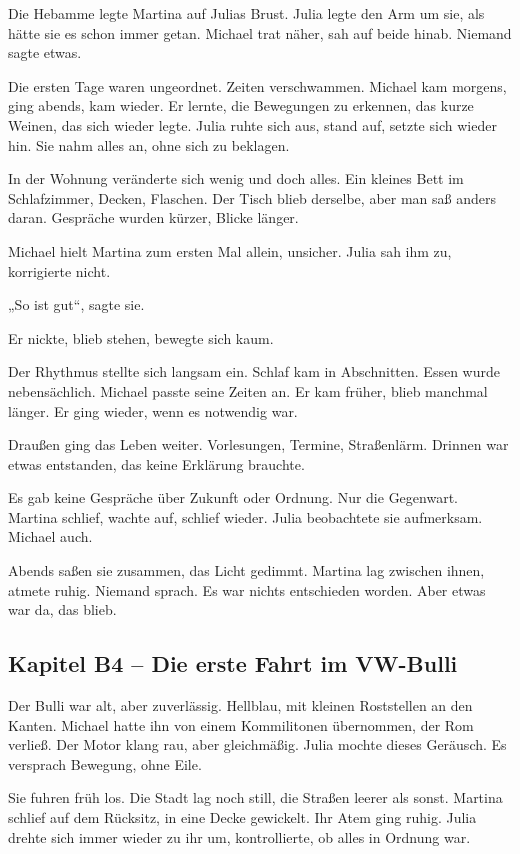 \documentclass[
]{article}
\begin{document}
Die Hebamme legte Martina auf Julias Brust. Julia legte den Arm um sie, als hätte sie es schon immer getan. Michael trat näher, sah auf beide hinab. Niemand sagte etwas.

Die ersten Tage waren ungeordnet. Zeiten verschwammen. Michael kam morgens, ging abends, kam wieder. Er lernte, die Bewegungen zu erkennen, das kurze Weinen, das sich wieder legte. Julia ruhte sich aus, stand auf, setzte sich wieder hin. Sie nahm alles an, ohne sich zu beklagen.

In der Wohnung veränderte sich wenig und doch alles. Ein kleines Bett im Schlafzimmer, Decken, Flaschen. Der Tisch blieb derselbe, aber man saß anders daran. Gespräche wurden kürzer, Blicke länger.

Michael hielt Martina zum ersten Mal allein, unsicher. Julia sah ihm zu, korrigierte nicht.

„So ist gut``, sagte sie.

Er nickte, blieb stehen, bewegte sich kaum.

Der Rhythmus stellte sich langsam ein. Schlaf kam in Abschnitten. Essen wurde nebensächlich. Michael passte seine Zeiten an. Er kam früher, blieb manchmal länger. Er ging wieder, wenn es notwendig war.

Draußen ging das Leben weiter. Vorlesungen, Termine, Straßenlärm. Drinnen war etwas entstanden, das keine Erklärung brauchte.

Es gab keine Gespräche über Zukunft oder Ordnung. Nur die Gegenwart. Martina schlief, wachte auf, schlief wieder. Julia beobachtete sie aufmerksam. Michael auch.

Abends saßen sie zusammen, das Licht gedimmt. Martina lag zwischen ihnen, atmete ruhig. Niemand sprach. Es war nichts entschieden worden. Aber etwas war da, das blieb.

\subsection{Kapitel B4 -- Die erste Fahrt im VW-Bulli}\label{kapitel-b4-die-erste-fahrt-im-vw-bulli}

Der Bulli war alt, aber zuverlässig. Hellblau, mit kleinen Roststellen an den Kanten. Michael hatte ihn von einem Kommilitonen übernommen, der Rom verließ. Der Motor klang rau, aber gleichmäßig. Julia mochte dieses Geräusch. Es versprach Bewegung, ohne Eile.

Sie fuhren früh los. Die Stadt lag noch still, die Straßen leerer als sonst. Martina schlief auf dem Rücksitz, in eine Decke gewickelt. Ihr Atem ging ruhig. Julia drehte sich immer wieder zu ihr um, kontrollierte, ob alles in Ordnung war.
\end{document}
